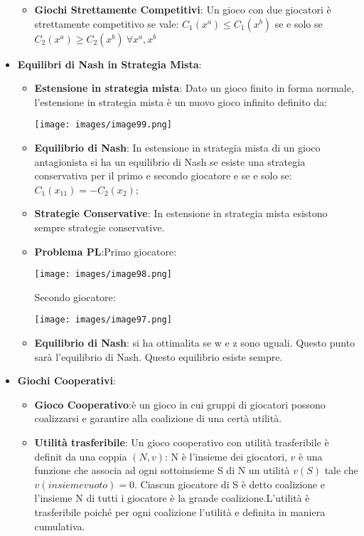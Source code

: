 \documentclass{article}
\theoremstyle{definition}
\theoremstyle{remark}
\begin{document}
\begin{itemize}
\begin{itemize}
        \item \textbf{Giochi Strettamente Competitivi}: Un gioco con due giocatori è strettamente competitivo se vale: $C_1(x^a)\leq C_1(x^b)$ se e solo se $C_2(x^a)\geq C_2(x^b)\ \forall x^a,x^b$
    \end{itemize}
    \item \textbf{Equilibri di Nash in Strategia Mista}:\begin{itemize}
        \item \textbf{Estensione in strategia mista}: Dato un gioco finito in forma normale, l'estensione in strategia mista è un nuovo gioco infinito definito da:\begin{center}
            \texttt{[image: images/image99.png]}
        \end{center}
        \item\textbf{Equilibrio di Nash}: In estensione in strategia mista di un gioco antagionista si ha un equilibrio di Nash se esiste una strategia conservativa per il primo e secondo giocatore e se e solo se: $C_1(x_11)=-C_2(x_2)$;
        \item \textbf{Strategie Conservative}: In estensione in strategia mista esistono sempre strategie conservative.
        \item \textbf{Problema PL}:Primo giocatore:\begin{center}
            \texttt{[image: images/image98.png]}
        \end{center}
        Secondo giocatore:\begin{center}
            \texttt{[image: images/image97.png]}
        \end{center}
        \item \textbf{Equilibrio di Nash}: si ha ottimalita se w e z sono uguali. Questo punto sarà l'equilibrio di Nash. Questo equilibrio esiste sempre.
    \end{itemize}
    \item \textbf{Giochi Cooperativi}:\begin{itemize}
        \item \textbf{Gioco Cooperativo}:è un gioco in cui gruppi di giocatori possono coalizzarsi e garantire alla coalizione di una certà utilità.
        \item \textbf{Utilità trasferibile}: Un gioco cooperativo con utilità trasferibile è definit da una coppia $(N,v)$: N è l'insieme dei giocatori, $v$ è una funzione che associa ad ogni sottoinsieme S di N un utilità $v(S)$ tale che $v(insiemevuoto)=0$. Ciascun giocatore di S è detto coalizione e l'insieme N di tutti i giocatore è la grande coalizione.\newline L'utilità è trasferibile poiché per ogni coalizione l'utilità e definita in maniera cumulativa.

\end{itemize}
\end{itemize}
\end{document}
